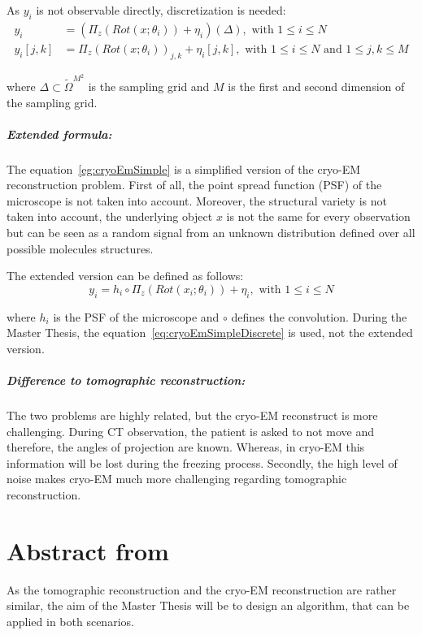 As $y_i$ is not observable directly, discretization is needed:
\begin{equation}
    \label{eg:cryoEmSimpleDiscrete}
    \begin{aligned}
        y_i &= \left( \Pi_z ( Rot (x; \theta_i)) + \eta_i\right)(\Delta), \text{ with } 1 \leq i \leq N \\
        y_i[j,k] &= \Pi_z ( Rot(x; \theta_i))_{j,k} + \eta_i[j,k], \text{ with } 1 \leq i \leq N \text{ and } 1 \leq j,k \leq M    
    \end{aligned}
\end{equation}

where $\Delta \subset \tilde{\Omega}^{M^2}$ is the sampling grid and $M$ is the first and second dimension of the sampling grid.


\subparagraph{Extended formula:} 
The equation~\ref{eg:cryoEmSimple} is a simplified version of the cryo-EM reconstruction problem.
First of all, the point spread function (PSF) of the microscope is not taken into account.
Moreover, the structural variety is not taken into account, the underlying object $x$ is not the same 
for every observation but can be seen as a random signal from an unknown distribution defined over all possible molecules structures.

The extended version can be defined as follows:
\begin{equation}
    \label{eg:cryoEmExtended}
    y_i = h_i \circ \Pi_z ( Rot (x_i; \theta_i)) + \eta_i, \text{ with } 1 \leq i \leq N
\end{equation}

where $h_i$ is the PSF of the microscope and $\circ$ defines the convolution. 
During the Master Thesis, the equation~\ref{eq:cryoEmSimpleDiscrete} is used, not the extended version.

\subparagraph{Difference to tomographic reconstruction:}
The two problems are highly related, but the cryo-EM reconstruct is more challenging.
During CT observation, the patient is asked to not move and therefore, the angles of projection are known.
Whereas, in cryo-EM this information will be lost during the freezing process.
Secondly, the high level of noise makes cryo-EM much more challenging regarding tomographic reconstruction.


\section{Abstract from}
As the tomographic reconstruction and the cryo-EM reconstruction are rather similar, 
the aim of the Master Thesis will be to design an algorithm, that can be applied in both scenarios.

